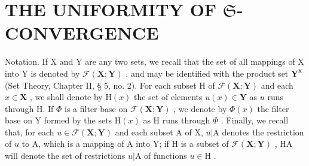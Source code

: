 \section{\texorpdfstring{THE UNIFORMITY OF \(\mathfrak{S}\)-CONVERGENCE}{THE UNIFORMITY OF S-CONVERGENCE}}

Notation. If X and Y are any two sets, we recall that the set of all mappings of X into Y is denoted by \(\mathcal{F}(\mathbf{X};\mathbf{Y})\) , and may be identified with the product set \(\mathbf{Y}^{\mathbf{x}}\) (Set Theory, Chapter II, § 5, no. 2). For each subset H of \(\mathcal{F}(\mathbf{X};\mathbf{Y})\) and each \(x\in \mathbf{X}\) , we shall denote by \(\mathrm{H}(x)\) the set of elements \(u(x)\in \mathbf{Y}\) as \(u\) runs through H. If \(\Phi\) is a filter base on \(\mathcal{F}(\mathbf{X};\mathbf{Y})\) , we denote by \(\Phi (x)\) the filter base on Y formed by the sets \(\mathrm{H}(x)\) as H runs through \(\Phi\) . Finally, we recall that, for each \(u\in \mathcal{F}(\mathbf{X};\mathbf{Y})\) and each subset A of X, \(u|\mathrm{A}\) denotes the restriction of \(u\) to A, which is a mapping of A into Y; if H is a subset of \(\mathcal{F}(\mathbf{X};\mathbf{Y})\) , H\textbar A will denote the set of restrictions \(u|\mathrm{A}\) of functions \(u\in \mathrm{H}\) .

